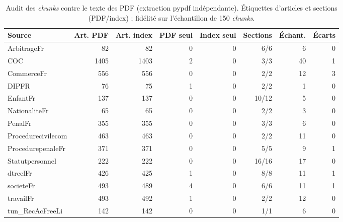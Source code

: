 \begin{table}[H]
\centering
\small
\begin{tabular}{lrrrrrrr}
\toprule
Source & Art. PDF & Art. index & PDF seul & Index seul & Sections & Échant. & Écarts \\
\midrule
ArbitrageFr & 82 & 82 & 0 & 0 & 6/6 & 6 & 0 \\
COC & 1405 & 1403 & 2 & 0 & 3/3 & 40 & 1 \\
CommerceFr & 556 & 556 & 0 & 0 & 2/2 & 12 & 3 \\
DIPFR & 76 & 75 & 1 & 0 & 2/2 & 1 & 0 \\
EnfantFr & 137 & 137 & 0 & 0 & 10/12 & 5 & 0 \\
NationaliteFr & 65 & 65 & 0 & 0 & 2/2 & 3 & 0 \\
PenalFr & 355 & 355 & 0 & 0 & 3/3 & 6 & 0 \\
Procedurecivilecom & 463 & 463 & 0 & 0 & 2/2 & 11 & 0 \\
ProcedurepenaleFr & 371 & 371 & 0 & 0 & 5/5 & 9 & 1 \\
Statutpersonnel & 222 & 222 & 0 & 0 & 16/16 & 17 & 0 \\
dtreelFr & 426 & 425 & 1 & 0 & 8/8 & 11 & 1 \\
societeFr & 493 & 489 & 4 & 0 & 6/6 & 11 & 1 \\
travailFr & 493 & 492 & 1 & 0 & 2/2 & 12 & 0 \\
tun\_RecAcFreeLi & 142 & 142 & 0 & 0 & 1/1 & 6 & 0 \\
\bottomrule
\end{tabular}
\caption{Audit des \emph{chunks} contre le texte des PDF (extraction pypdf indépendante). Étiquettes d'articles et sections (PDF/index) ; fidélité sur l'échantillon de 150 \emph{chunks}.}
\label{tab:audit}
\end{table}
